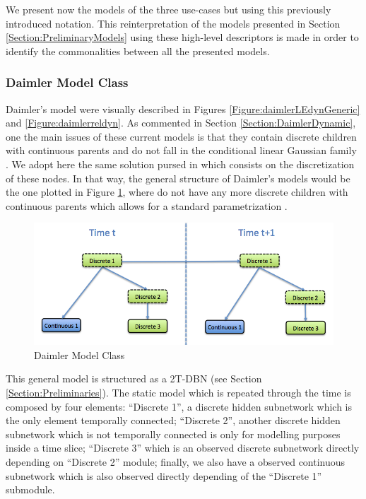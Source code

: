 We present now the models of the three use-cases but using this previously introduced notation. This reinterpretation of the models presented in Section \ref{Section:PreliminaryModels} using these high-level descriptors is made in order to identify the commonalities between all the presented models. 

\subsubsection*{Daimler Model Class}

Daimler's model were visually described in Figures \ref{Figure:daimlerLEdynGeneric}  and \ref{Figure:daimlerreldyn}. As commented in Section \ref{Section:DaimlerDynamic}, one the main issues of these current models is that they contain discrete children with continuous parents and do not fall in the conditional linear Gaussian family \cite{JensenNielsen2007}. We adopt here the same solution pursed in \cite{kasper2012object} which consists on the discretization of these nodes. In that way, the general structure of Daimler's models would be the one plotted in Figure \ref{Figure:DaimlerModelClass}, where do not have any more discrete children with continuous parents which allows for a standard parametrization \cite{JensenNielsen2007}. 

\begin{figure}
\begin{center}
\includegraphics[scale=0.4]{./figures/DaimlerModelClass}
\caption{\label{Figure:DaimlerModelClass} Daimler Model Class}
\end{center}
\end{figure}

This general model is structured as a 2T-DBN  (see Section \ref{Section:Preliminaries}). The static model which is repeated through the time is composed by four elements: ``Discrete 1'',  a discrete hidden subnetwork which is the only element temporally connected; ``Discrete 2'',  another discrete hidden subnetwork which is not temporally connected is only for modelling purposes inside a time slice; ``Discrete 3'' which is an observed discrete subnetwork directly depending on ``Discrete 2'' module; finally, we also have a observed continuous subnetwork which is also observed directly depending of the ``Discrete 1'' submodule. 

